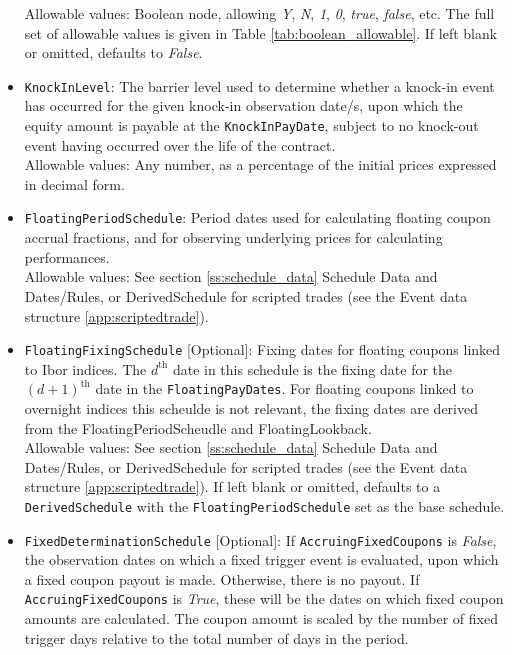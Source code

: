 \begin{itemize}
    Allowable values: Boolean node, allowing \emph{Y}, \emph{N}, \emph{1}, \emph{0},
    \emph{true}, \emph{false}, etc. The full set of allowable values is given in Table
    \ref{tab:boolean_allowable}. If left blank or omitted, defaults to \emph{False}.
  \item \lstinline!KnockInLevel!: The barrier level used to determine whether
  a knock-in event has occurred for the given knock-in observation date/s, upon which the
  equity amount is payable at the \lstinline!KnockInPayDate!, subject to no knock-out event
  having occurred over the life of the contract. \\
  Allowable values: Any number, as a percentage of the initial prices expressed in decimal
  form.
  \item \lstinline!FloatingPeriodSchedule!: Period dates used for calculating floating coupon
  accrual fractions, and for observing underlying prices for calculating performances. \\
    Allowable values: See section \ref{ss:schedule_data} Schedule Data and Dates/Rules, or
    DerivedSchedule for scripted trades (see the Event data structure \ref{app:scriptedtrade}).
  \item \lstinline!FloatingFixingSchedule! [Optional]: Fixing dates for floating coupons linked
    to Ibor indices. The $d^\text{th}$ date in this schedule is the fixing date for the $(d+1)^\text{th}$
    date in the \lstinline!FloatingPayDates!. For floating coupons linked to overnight indices
    this scheulde is not relevant, the fixing dates are derived from the FloatingPeriodScheudle
    and FloatingLookback. \\
    Allowable values: See section \ref{ss:schedule_data} Schedule Data and Dates/Rules, or
    DerivedSchedule for scripted trades (see the Event data structure \ref{app:scriptedtrade}).
    If left blank or omitted, defaults to a \lstinline!DerivedSchedule! with the
    \lstinline!FloatingPeriodSchedule! set as the base schedule.
  \item \lstinline!FixedDeterminationSchedule! [Optional]: If \lstinline!AccruingFixedCoupons!
  is \emph{False}, the observation dates on which a fixed trigger event is evaluated, upon
  which a fixed coupon payout is made. Otherwise, there is no payout. If
  \lstinline!AccruingFixedCoupons! is \emph{True}, these will be the dates on which fixed
  coupon amounts are calculated. The coupon amount is scaled by the number of fixed trigger
  days relative to the total number of days in the period. \\

\end{itemize}
